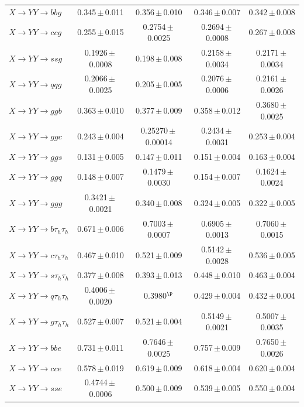 \documentclass[12pt]{article}   %
\begin{document}
\begin{landscape}
{\begin{longtable}{@{\extracolsep{\fill}}lcccc@{}}
$X\to YY\to bbg$ & 0.345\,$\pm$\,0.011 & 0.356\,$\pm$\,0.010 & 0.346\,$\pm$\,0.007 & 0.342\,$\pm$\,0.008 \\
$X\to YY\to ccg$ & 0.255\,$\pm$\,0.015 & 0.2754\,$\pm$\,0.0025 & 0.2694\,$\pm$\,0.0008 & 0.267\,$\pm$\,0.008 \\
$X\to YY\to ssg$ & 0.1926\,$\pm$\,0.0008 & 0.198\,$\pm$\,0.008 & 0.2158\,$\pm$\,0.0034 & 0.2171\,$\pm$\,0.0034 \\
$X\to YY\to qqg$ & 0.2066\,$\pm$\,0.0025 & 0.205\,$\pm$\,0.005 & 0.2076\,$\pm$\,0.0006 & 0.2161\,$\pm$\,0.0026 \\
$X\to YY\to ggb$ & 0.363\,$\pm$\,0.010 & 0.377\,$\pm$\,0.009 & 0.358\,$\pm$\,0.012 & 0.3680\,$\pm$\,0.0025 \\
$X\to YY\to ggc$ & 0.243\,$\pm$\,0.004 & 0.25270\,$\pm$\,0.00014 & 0.2434\,$\pm$\,0.0031 & 0.253\,$\pm$\,0.004 \\
$X\to YY\to ggs$ & 0.131\,$\pm$\,0.005 & 0.147\,$\pm$\,0.011 & 0.151\,$\pm$\,0.004 & 0.163\,$\pm$\,0.004 \\
$X\to YY\to ggq$ & 0.148\,$\pm$\,0.007 & 0.1479\,$\pm$\,0.0030 & 0.154\,$\pm$\,0.007 & 0.1624\,$\pm$\,0.0024 \\
$X\to YY\to ggg$ & 0.3421\,$\pm$\,0.0021 & 0.340\,$\pm$\,0.008 & 0.324\,$\pm$\,0.005 & 0.322\,$\pm$\,0.005 \\
\midrule
$X\to YY\to b\tau_h\tau_h$ & 0.671\,$\pm$\,0.006 & 0.7003\,$\pm$\,0.0007 & 0.6905\,$\pm$\,0.0013 & 0.7060\,$\pm$\,0.0015 \\
$X\to YY\to c\tau_h\tau_h$ & 0.467\,$\pm$\,0.010 & 0.521\,$\pm$\,0.009 & 0.5142\,$\pm$\,0.0028 & 0.536\,$\pm$\,0.005 \\
$X\to YY\to s\tau_h\tau_h$ & 0.377\,$\pm$\,0.008 & 0.393\,$\pm$\,0.013 & 0.448\,$\pm$\,0.010 & 0.463\,$\pm$\,0.004 \\
$X\to YY\to q\tau_h\tau_h$ & 0.4006\,$\pm$\,0.0020 & 0.3980$^{\P}$ & 0.429\,$\pm$\,0.004 & 0.432\,$\pm$\,0.004 \\
$X\to YY\to g\tau_h\tau_h$ & 0.527\,$\pm$\,0.007 & 0.521\,$\pm$\,0.004 & 0.5149\,$\pm$\,0.0021 & 0.5007\,$\pm$\,0.0035 \\
\midrule
$X\to YY\to bbe$ & 0.731\,$\pm$\,0.011 & 0.7646\,$\pm$\,0.0025 & 0.757\,$\pm$\,0.009 & 0.7650\,$\pm$\,0.0026 \\
$X\to YY\to cce$ & 0.578\,$\pm$\,0.019 & 0.619\,$\pm$\,0.009 & 0.618\,$\pm$\,0.004 & 0.620\,$\pm$\,0.004 \\
$X\to YY\to sse$ & 0.4744\,$\pm$\,0.0006 & 0.500\,$\pm$\,0.009 & 0.539\,$\pm$\,0.005 & 0.550\,$\pm$\,0.004 \\

\end{longtable}}
\end{landscape}
\end{document}
